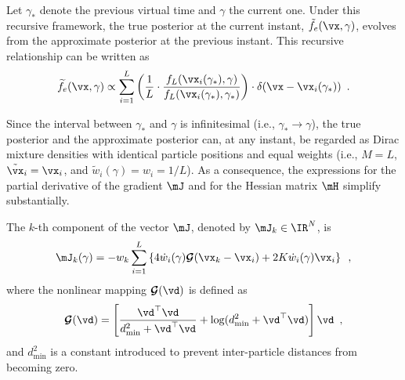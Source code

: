 Let $\gamma_*$ denote the previous virtual time and $\gamma$ the current one. Under this recursive framework, the true posterior at the current instant, $\tilde{f}_e(\vx,\gamma)$, evolves from the approximate posterior at the previous instant. This recursive relationship can be written as
\begin{equation}
	\widetilde{f}_e(\vx, \gamma) \propto \sum_{i=1}^L \left( \frac{1}{L} \cdot \frac{f_L(\vx_i(\gamma_*), \gamma)}{f_L(\vx_i(\gamma_*), \gamma_*)} \right) \cdot \delta(\vx - \vx_i(\gamma_*)) \enspace.
\end{equation}

Since the interval between $\gamma_*$ and $\gamma$ is infinitesimal (i.e., $\gamma_* \to \gamma$), the true posterior and the approximate posterior can, at any instant, be regarded as Dirac mixture densities with identical particle positions and equal weights (i.e., $M=L$, $\tilde{\vx}_i = \vx_i$, and $\tilde{w}_i(\gamma)=w_i=1/L$). As a consequence, the expressions for the partial derivative of the gradient $\mJ$ and for the Hessian matrix $\mH$ simplify substantially.

The $k$-th component of the vector $\mJ$, denoted by $\mJ_k \in \IR^N$, is
\begin{equation}
	\mJ_k(\gamma) = -w_k \sum_{i=1}^L \left\{ 4\dot{w}_i(\gamma) \boldsymbol{\mathcal{G}}(\vx_k - \vx_i) + 2K\dot{w}_i(\gamma)\vx_i \right\} \enspace,
\end{equation}
where the nonlinear mapping $\boldsymbol{\mathcal{G}}(\vd)$ is defined as
\begin{equation}
	\boldsymbol{\mathcal{G}}(\vd) = \left[ \frac{\vd^{\top}\vd}{d_{\min}^2 + \vd^{\top}\vd} + \log(d_{\min}^2 + \vd^{\top}\vd) \right] \vd \enspace,
\end{equation}
and $d_{\min}^2$ is a constant introduced to prevent inter-particle distances from becoming zero.

